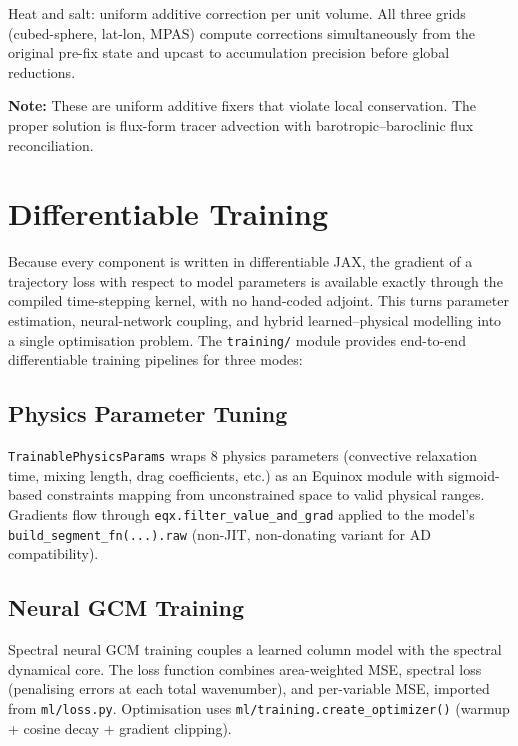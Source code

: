 \documentclass[11pt,twoside]{report}
\begin{document}
Heat and salt: uniform additive correction per unit volume.
All three grids (cubed-sphere, lat-lon, MPAS) compute corrections simultaneously from the original pre-fix state and upcast to accumulation precision before global reductions.

\textbf{Note:} These are uniform additive fixers that violate local conservation.  The proper solution is flux-form tracer advection with barotropic--baroclinic flux reconciliation.


\chapter{Differentiable Training}
\label{ch:training}

Because every component is written in differentiable JAX, the gradient of a
trajectory loss with respect to model parameters is available exactly through
the compiled time-stepping kernel, with no hand-coded adjoint.  This turns
parameter estimation, neural-network coupling, and hybrid learned--physical
modelling into a single optimisation problem.  The \texttt{training/} module
provides end-to-end differentiable training pipelines for three modes:

\section{Physics Parameter Tuning}

\texttt{TrainablePhysicsParams} wraps 8 physics parameters (convective
relaxation time, mixing length, drag coefficients, etc.) as an Equinox
module with sigmoid-based constraints mapping from unconstrained space to
valid physical ranges.  Gradients flow through
\texttt{eqx.filter\_value\_and\_grad} applied to the model's
\texttt{build\_segment\_fn(...).raw} (non-JIT, non-donating variant for AD
compatibility).

\section{Neural GCM Training}

Spectral neural GCM training couples a learned column model with the
spectral dynamical core.  The loss function combines area-weighted MSE,
spectral loss (penalising errors at each total wavenumber), and
per-variable MSE, imported from \texttt{ml/loss.py}.  Optimisation uses
\texttt{ml/training.create\_optimizer()} (warmup + cosine decay + gradient
clipping).
\end{document}
